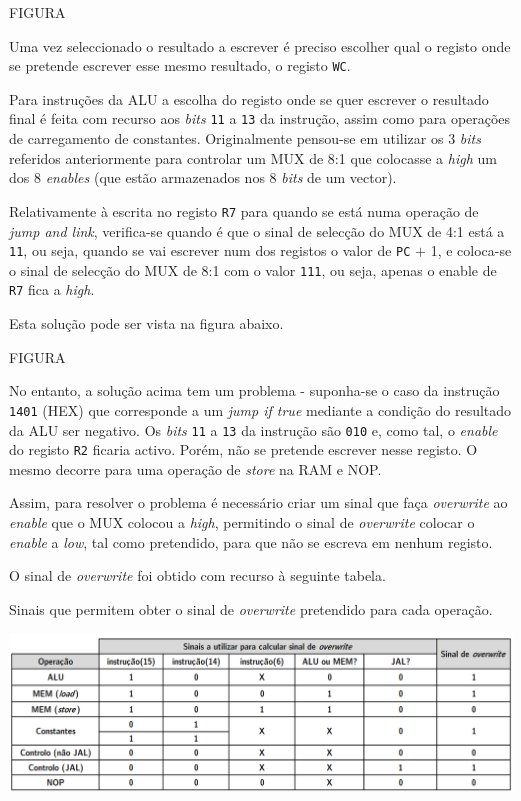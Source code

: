 \documentclass[11pt]{article}
\numberwithin{equation}{section}
\begin{document}
FIGURA

Uma vez seleccionado o resultado a escrever é preciso escolher qual o registo onde se pretende escrever esse mesmo resultado, o registo \texttt{WC}. 

Para instruções da ALU a escolha do registo onde se quer escrever o resultado final é feita com recurso aos \textit{bits} \texttt{11} a \texttt{13} da instrução, assim como para operações de carregamento de constantes. Originalmente pensou-se em utilizar os 3 \textit{bits} referidos anteriormente para controlar um MUX de 8:1 que colocasse a \textit{high} um dos 8 \textit{enables} (que estão armazenados nos 8 \textit{bits} de um vector).

Relativamente à escrita no registo \texttt{R7} para quando se está numa operação de \textit{jump and link}, verifica-se quando é que o sinal de selecção do MUX de 4:1 está a \texttt{11}, ou seja, quando se vai escrever num dos registos o valor de \texttt{PC} $+$ 1, e coloca-se o sinal de selecção do MUX de 8:1 com o valor \texttt{111}, ou seja, apenas o enable de \texttt{R7} fica a \textit{high}.

Esta solução pode ser vista na figura abaixo.

FIGURA

No entanto, a solução acima tem um problema - suponha-se o caso da instrução \texttt{1401} (HEX) que corresponde a um \textit{jump if true} mediante a condição do resultado da ALU ser negativo. Os \textit{bits} \texttt{11} a \texttt{13} da instrução são \texttt{010} e, como tal, o \textit{enable} do registo \texttt{R2} ficaria activo. Porém, não se pretende escrever nesse registo. O mesmo decorre para uma operação de \textit{store} na RAM e NOP. 

Assim, para resolver o problema é necessário criar um sinal que faça \textit{overwrite} ao \textit{enable} que o MUX colocou a \textit{high}, permitindo o sinal de \textit{overwrite} colocar o \textit{enable} a \textit{low}, tal como pretendido, para que não se escreva em nenhum registo.

O sinal de \textit{overwrite} foi obtido com recurso à seguinte tabela.

\vspace{1.5mm}
\begin{table}[h]
	\centering
	\caption{Sinais que permitem obter o sinal de \textit{overwrite} pretendido para cada operação.}
	\vspace{-2mm}
 	\includegraphics[width=1\linewidth]{tabelas/tabelaWE}
\end{table}
\end{document}
